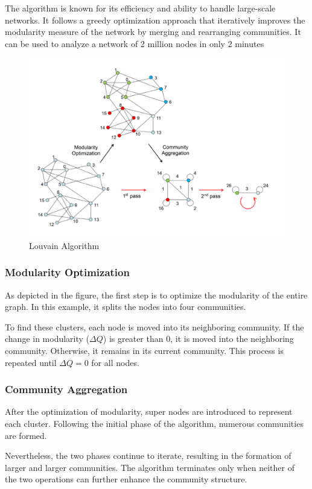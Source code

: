 The algorithm is known for its efficiency and ability to handle large-scale networks. It follows a greedy optimization approach that iteratively improves the modularity measure of the network by merging and rearranging communities. 
It can be used to analyze a network of 2 million nodes in only 2 minutes \\
\begin{center}
    \begin{figure}[!htp]
    \centering
    \includegraphics[width=0.7 \textwidth]{image/Louvain.png}
    \caption{Louvain Algorithm}
    \label{subsection}
\end{figure}
\end{center}
\subsubsection{Modularity Optimization}
As depicted in the figure, the first step is to optimize the modularity of the entire graph. In this example, it splits the nodes into four communities.

To find these clusters, each node is moved into its neighboring community. If the change in modularity (\(\Delta Q\)) is greater than 0, it is moved into the neighboring community. Otherwise, it remains in its current community. This process is repeated until \(\Delta Q = 0\) for all nodes.
\subsubsection{Community Aggregation}
After the optimization of modularity, super nodes are introduced to represent each cluster. Following the initial phase of the algorithm, numerous communities are formed.

Nevertheless, the two phases continue to iterate, resulting in the formation of larger and larger communities. The algorithm terminates only when neither of the two operations can further enhance the community structure.

